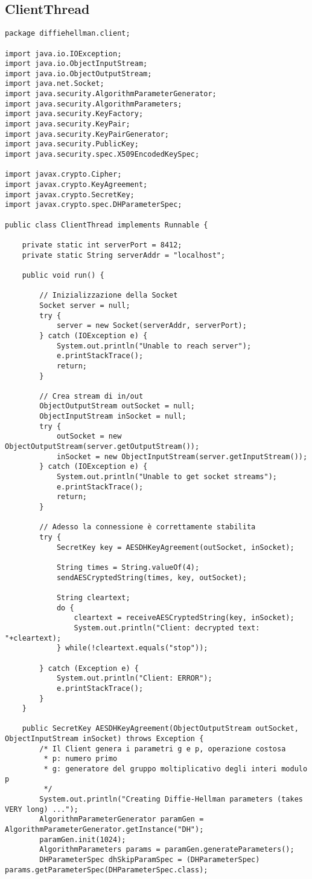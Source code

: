 \documentclass[12pt]{article}
\begin{document}
\subsection*{ClientThread}
\begin{lstlisting}
package diffiehellman.client;

import java.io.IOException;
import java.io.ObjectInputStream;
import java.io.ObjectOutputStream;
import java.net.Socket;
import java.security.AlgorithmParameterGenerator;
import java.security.AlgorithmParameters;
import java.security.KeyFactory;
import java.security.KeyPair;
import java.security.KeyPairGenerator;
import java.security.PublicKey;
import java.security.spec.X509EncodedKeySpec;

import javax.crypto.Cipher;
import javax.crypto.KeyAgreement;
import javax.crypto.SecretKey;
import javax.crypto.spec.DHParameterSpec;

public class ClientThread implements Runnable {

	private static int serverPort = 8412;
	private static String serverAddr = "localhost";

	public void run() {

		// Inizializzazione della Socket
		Socket server = null;
		try {
			server = new Socket(serverAddr, serverPort);
		} catch (IOException e) {
			System.out.println("Unable to reach server");
			e.printStackTrace();
			return;
		}

		// Crea stream di in/out
		ObjectOutputStream outSocket = null;
		ObjectInputStream inSocket = null;
		try {
			outSocket = new ObjectOutputStream(server.getOutputStream());
			inSocket = new ObjectInputStream(server.getInputStream());
		} catch (IOException e) {
			System.out.println("Unable to get socket streams");
			e.printStackTrace();
			return;
		}

		// Adesso la connessione è correttamente stabilita
		try {
			SecretKey key = AESDHKeyAgreement(outSocket, inSocket);

			String times = String.valueOf(4);
			sendAESCryptedString(times, key, outSocket);

			String cleartext;
			do {
				cleartext = receiveAESCryptedString(key, inSocket);
				System.out.println("Client: decrypted text: "+cleartext);
			} while(!cleartext.equals("stop"));

		} catch (Exception e) {
			System.out.println("Client: ERROR");
			e.printStackTrace();
		}
	}

	public SecretKey AESDHKeyAgreement(ObjectOutputStream outSocket, ObjectInputStream inSocket) throws Exception {
		/* Il Client genera i parametri g e p, operazione costosa
		 * p: numero primo
		 * g: generatore del gruppo moltiplicativo degli interi modulo p
		 */
		System.out.println("Creating Diffie-Hellman parameters (takes VERY long) ...");
		AlgorithmParameterGenerator paramGen = AlgorithmParameterGenerator.getInstance("DH");
		paramGen.init(1024);
		AlgorithmParameters params = paramGen.generateParameters();
		DHParameterSpec dhSkipParamSpec = (DHParameterSpec) params.getParameterSpec(DHParameterSpec.class);


\end{lstlisting}
\end{document}
